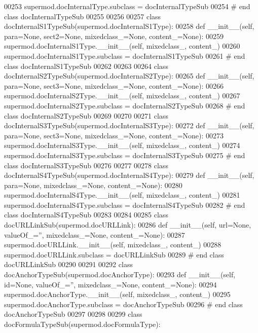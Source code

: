 \begin{DoxyCode}
00253 supermod.docInternalType.subclass = docInternalTypeSub
00254 \textcolor{comment}{# end class docInternalTypeSub}
00255 
00256 
00257 \textcolor{keyword}{class }docInternalS1TypeSub(supermod.docInternalS1Type):
00258     \textcolor{keyword}{def }__init__(self, para=None, sect2=None, mixedclass\_=None, content\_=None):
00259         supermod.docInternalS1Type.\_\_init\_\_(self, mixedclass\_, content\_)
00260 supermod.docInternalS1Type.subclass = docInternalS1TypeSub
00261 \textcolor{comment}{# end class docInternalS1TypeSub}
00262 
00263 
00264 \textcolor{keyword}{class }docInternalS2TypeSub(supermod.docInternalS2Type):
00265     \textcolor{keyword}{def }__init__(self, para=None, sect3=None, mixedclass\_=None, content\_=None):
00266         supermod.docInternalS2Type.\_\_init\_\_(self, mixedclass\_, content\_)
00267 supermod.docInternalS2Type.subclass = docInternalS2TypeSub
00268 \textcolor{comment}{# end class docInternalS2TypeSub}
00269 
00270 
00271 \textcolor{keyword}{class }docInternalS3TypeSub(supermod.docInternalS3Type):
00272     \textcolor{keyword}{def }__init__(self, para=None, sect3=None, mixedclass\_=None, content\_=None):
00273         supermod.docInternalS3Type.\_\_init\_\_(self, mixedclass\_, content\_)
00274 supermod.docInternalS3Type.subclass = docInternalS3TypeSub
00275 \textcolor{comment}{# end class docInternalS3TypeSub}
00276 
00277 
00278 \textcolor{keyword}{class }docInternalS4TypeSub(supermod.docInternalS4Type):
00279     \textcolor{keyword}{def }__init__(self, para=None, mixedclass\_=None, content\_=None):
00280         supermod.docInternalS4Type.\_\_init\_\_(self, mixedclass\_, content\_)
00281 supermod.docInternalS4Type.subclass = docInternalS4TypeSub
00282 \textcolor{comment}{# end class docInternalS4TypeSub}
00283 
00284 
00285 \textcolor{keyword}{class }docURLLinkSub(supermod.docURLLink):
00286     \textcolor{keyword}{def }__init__(self, url=None, valueOf\_='', mixedclass\_=None, content\_=None):
00287         supermod.docURLLink.\_\_init\_\_(self, mixedclass\_, content\_)
00288 supermod.docURLLink.subclass = docURLLinkSub
00289 \textcolor{comment}{# end class docURLLinkSub}
00290 
00291 
00292 \textcolor{keyword}{class }docAnchorTypeSub(supermod.docAnchorType):
00293     \textcolor{keyword}{def }__init__(self, id=None, valueOf\_='', mixedclass\_=None, content\_=None):
00294         supermod.docAnchorType.\_\_init\_\_(self, mixedclass\_, content\_)
00295 supermod.docAnchorType.subclass = docAnchorTypeSub
00296 \textcolor{comment}{# end class docAnchorTypeSub}
00297 
00298 
00299 \textcolor{keyword}{class }docFormulaTypeSub(supermod.docFormulaType):

\end{DoxyCode}
